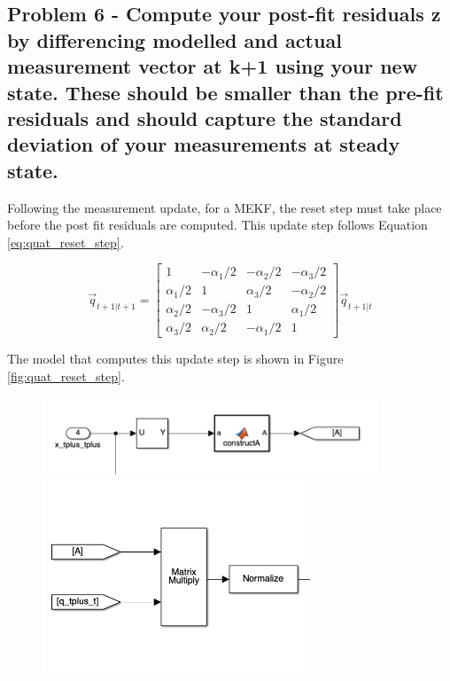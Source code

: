 \subsection{Problem 6 - Compute your post-fit residuals z by differencing modelled and actual measurement vector at k+1 using your new state. These should be smaller than the pre-fit residuals and should capture the standard deviation of your measurements at steady state.}

Following the measurement update, for a MEKF, the reset step must take place before the post fit residuals are computed. This update step follows Equation \ref{eq:quat_reset_step}.

\begin{equation} \label{eq:quat_reset_step}
    \vec{q}_{t+1 \vert t+1} = \begin{bmatrix}
        1 & -\alpha_1/2 & -\alpha_2/2 & -\alpha_3/2 \\
        \alpha_1/2 & 1 & \alpha_3/2 & -\alpha_2/2 \\
        \alpha_2/2 & -\alpha_3/2 & 1 & \alpha_1/2 \\
        \alpha_3/2 & \alpha_2/2 & -\alpha_1/2 & 1
    \end{bmatrix} \vec{q}_{t+1 \vert t}
\end{equation}

The model that computes this update step is shown in Figure \ref{fig:quat_reset_step}.

\begin{figure}[H]
    \centering
    \includegraphics[width = 10cm]{Images/PS8/quat_update_2.png}
    \includegraphics[width = 8cm]{Images/PS8/quat_update_1.png}
\end{figure}

